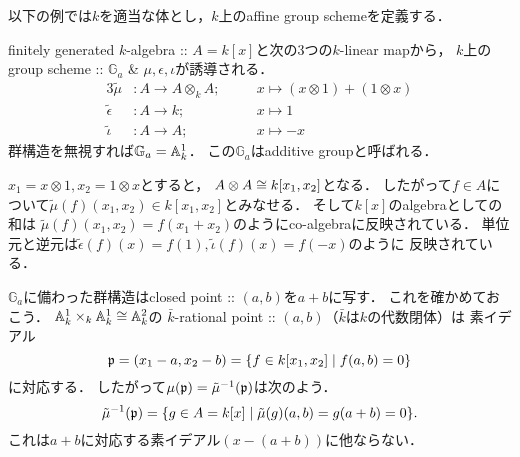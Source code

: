 \documentclass[a4paper]{jsarticle}
\newcommand{\Ga}{\mathbb{G}_a}
\begin{document}
    以下の例では$k$を適当な体とし，$k$上のaffine group schemeを定義する．
    \begin{Example}[$\Ga$]
        finitely generated $k$-algebra :: $A=k[x]$と次の3つの$k$-linear mapから，
        $k$上のgroup scheme :: $\Ga$ \& $\mu,\epsilon,\iota$が誘導される．
        \begin{alignat*}{3}
            \tilde{\mu}&:
                A \to A \otimes_k A; &&
                \quad x \mapsto (x \otimes 1)+(1 \otimes x) \\
            \tilde{\epsilon}&:
                A \to k; &&
                \quad x \mapsto 1 \\
            \tilde{\iota}&:
                A \to A; &&
                \quad x \mapsto -x
        \end{alignat*}
        群構造を無視すれば$\Ga=\affine^1_k$．
        この$\Ga$はadditive groupと呼ばれる．

        $x_1=x \otimes 1, x_2=1 \otimes x$とすると，
        $A \otimes A \cong k[x_1,x_2]$となる．
        したがって$f \in A$について$\tilde{\mu}(f)(x_1,x_2) \in k[x_1,x_2]$とみなせる．
        そして$k[x]$のalgebraとしての和は
        $\tilde{\mu}(f)(x_1,x_2)=f(x_1+x_2)$のようにco-algebraに反映されている．
        単位元と逆元は$\tilde{\epsilon}(f)(x)=f(1), \tilde{\iota}(f)(x)=f(-x)$のように
        反映されている．
    
        $\Ga$に備わった群構造はclosed point :: $(a,b)$を$a+b$に写す．
        これを確かめておこう．
        $\mathbb{A}^1_k \times_k \mathbb{A}^1_k \cong \mathbb{A}^2_k$の
        $\bar{k}$-rational point :: $(a,b)$（$\bar{k}$は$k$の代数閉体）は
        素イデアル
        \[ \mathfrak{p}=(x_1-a, x_2-b)=\{ f \in k[x_1,x_2] \mid f(a,b)=0 \} \]に対応する．
        したがって$\mu(\mathfrak{p})=\tilde{\mu}^{-1}(\mathfrak{p})$は次のよう．
        \[ \tilde{\mu}^{-1}(\mathfrak{p})=\{ g \in A=k[x] \mid \tilde{\mu}(g)(a,b)=g(a+b)=0 \}. \]
        これは$a+b$に対応する素イデアル$(x-(a+b))$に他ならない．
    \end{Example}
\end{document}
